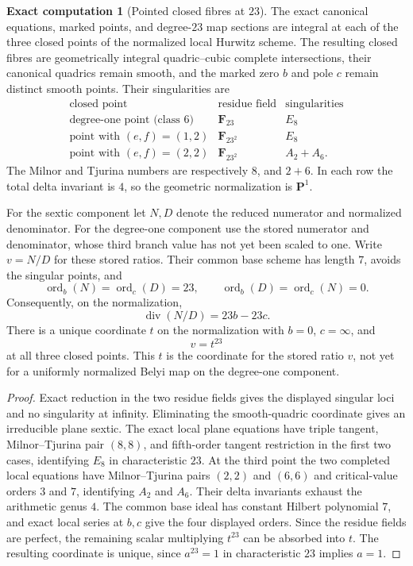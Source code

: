 \documentclass[11pt]{amsart}
\theoremstyle{definition}
\newtheorem{computation}[computation]{Exact computation}
\theoremstyle{remark}
\newcommand{\FF}{\mathbf F}
\newcommand{\PP}{\mathbf P}
\newcommand{\ord}{\operatorname{ord}}
\begin{document}
\begin{computation}[Pointed closed fibres at $23$]
\label{comp:hurwitz-pointed-23}
The exact canonical equations, marked points, and degree-$23$ map sections
are integral at each of the three closed points of the normalized local
Hurwitz scheme.  The resulting closed fibres are geometrically integral
quadric--cubic complete intersections, their canonical quadrics remain
smooth, and the marked zero $b$ and pole $c$ remain distinct smooth points.
Their singularities are
\[
\begin{array}{c|c|c}
\text{closed point}&\text{residue field}&\text{singularities}\\
\hline
\text{degree-one point (class 6)}&\FF_{23}&E_8\\
\text{point with }(e,f)=(1,2)&\FF_{23^2}&E_8\\
\text{point with }(e,f)=(2,2)&\FF_{23^2}&A_2+A_6.
\end{array}
\]
The Milnor and Tjurina numbers are respectively $8$, and $2+6$.  In each
row the total delta invariant is $4$, so the geometric normalization is
$\PP^1$.

For the sextic component let $N,D$ denote the reduced numerator and
normalized denominator.  For the degree-one component use the stored
numerator and denominator, whose third branch value has not yet been
scaled to one.  Write $v=N/D$ for these stored ratios.
Their common base scheme
has length $7$, avoids the singular points, and
\[
 \ord_b(N)=\ord_c(D)=23,
 \qquad \ord_b(D)=\ord_c(N)=0.
\]
Consequently, on the normalization,
\[
 \operatorname{div}(N/D)=23b-23c.
\]
There is a unique coordinate $t$ on the normalization with $b=0$,
$c=\infty$, and
\[
 v=t^{23}
\]
at all three closed points.  This $t$ is the coordinate for the
stored ratio $v$, not yet for a uniformly normalized Belyi map
on the degree-one component.
\end{computation}

\begin{proof}
Exact reduction in the two residue fields gives the displayed singular
loci and no singularity at infinity.  Eliminating the smooth-quadric
coordinate gives an irreducible plane sextic.  The exact local plane
equations have
triple tangent, Milnor--Tjurina pair $(8,8)$, and fifth-order tangent
restriction in the first two cases, identifying $E_8$ in characteristic
$23$.  At the third point the two completed local equations have
Milnor--Tjurina pairs $(2,2)$ and $(6,6)$ and critical-value orders $3$ and
$7$, identifying $A_2$ and $A_6$.  Their delta invariants exhaust the
arithmetic genus $4$.  The common base ideal has constant Hilbert polynomial
$7$, and exact local series at $b,c$ give the four displayed orders.  Since
the residue fields are perfect, the remaining scalar multiplying $t^{23}$
can be absorbed into $t$.  The resulting coordinate is unique, since
$a^{23}=1$ in characteristic $23$ implies $a=1$.
\end{proof}
\end{document}
